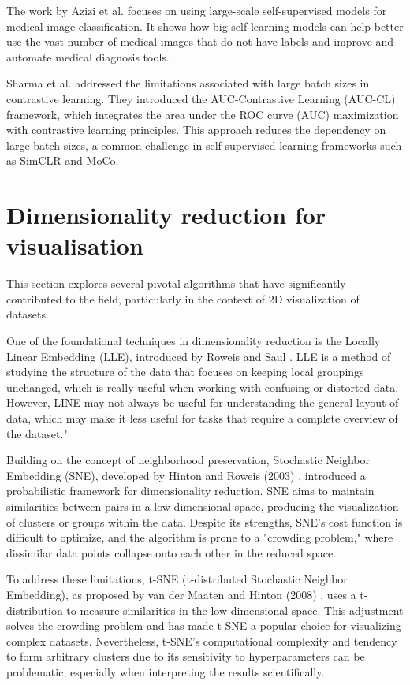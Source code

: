 The work by Azizi et al. \cite{azizi} focuses on using large-scale self-supervised models for medical image classification. It shows how big self-learning models can help better use the vast number of medical images that do not have labels and improve and automate medical diagnosis tools.

Sharma et al. \cite{sharma2023auc} addressed the limitations associated with large batch sizes in contrastive learning. They introduced the AUC-Contrastive Learning (AUC-CL) framework, which integrates the area under the ROC curve (AUC) maximization with contrastive learning principles. This approach reduces the dependency on large batch sizes, a common challenge in self-supervised learning frameworks such as SimCLR and MoCo.

\section{Dimensionality reduction for visualisation}

This section explores several pivotal algorithms that have significantly contributed to the field, particularly in the context of 2D visualization of datasets.

One of the foundational techniques in dimensionality reduction is the Locally Linear Embedding (LLE), introduced by Roweis and Saul \cite{roweis2000nonlinear}. LLE is a method of studying the structure of the data that focuses on keeping local groupings unchanged, which is really useful when working with confusing or distorted data. However, LINE may not always be useful for understanding the general layout of data, which may make it less useful for tasks that require a complete overview of the dataset."

Building on the concept of neighborhood preservation, Stochastic Neighbor Embedding (SNE), developed by Hinton and Roweis (2003) \cite{hinton2002stochastic}, introduced a probabilistic framework for dimensionality reduction. SNE aims to maintain similarities between pairs in a low-dimensional space, producing the visualization of clusters or groups within the data. Despite its strengths, SNE's cost function is difficult to optimize, and the algorithm is prone to a "crowding problem," where dissimilar data points collapse onto each other in the reduced space.

To address these limitations, t-SNE (t-distributed Stochastic Neighbor Embedding), as proposed by van der Maaten and Hinton (2008) \cite {van2008visualizing}, uses a t-distribution to measure similarities in the low-dimensional space. This adjustment solves the crowding problem and has made t-SNE a popular choice for visualizing complex datasets. Nevertheless, t-SNE's computational complexity and tendency to form arbitrary clusters due to its sensitivity to hyperparameters can be problematic, especially when interpreting the results scientifically.

